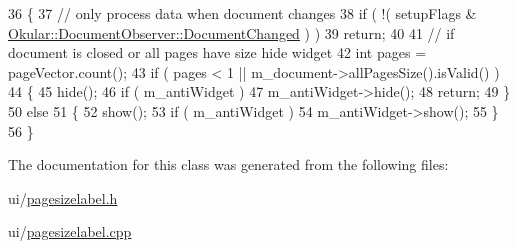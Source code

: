 \begin{DoxyCode}
36 \{
37     \textcolor{comment}{// only process data when document changes}
38     \textcolor{keywordflow}{if} ( !( setupFlags & \hyperlink{classOkular_1_1DocumentObserver_aba00584af99894f95a9650e91f109d40ae599564392c01b22e96eff7602c4dd03}{Okular::DocumentObserver::DocumentChanged}
       ) )
39         \textcolor{keywordflow}{return};
40 
41     \textcolor{comment}{// if document is closed or all pages have size hide widget}
42     \textcolor{keywordtype}{int} pages = pageVector.count();
43     \textcolor{keywordflow}{if} ( pages < 1 || m\_document->allPagesSize().isValid() )
44     \{
45         hide();
46         \textcolor{keywordflow}{if} ( m\_antiWidget )
47             m\_antiWidget->hide();
48         \textcolor{keywordflow}{return};
49     \}
50     \textcolor{keywordflow}{else}
51     \{
52         show();
53         \textcolor{keywordflow}{if} ( m\_antiWidget )
54             m\_antiWidget->show();
55     \}
56 \}
\end{DoxyCode}


The documentation for this class was generated from the following files\+:\begin{DoxyCompactItemize}
\item 
ui/\hyperlink{pagesizelabel_8h}{pagesizelabel.\+h}\item 
ui/\hyperlink{pagesizelabel_8cpp}{pagesizelabel.\+cpp}\end{DoxyCompactItemize}
